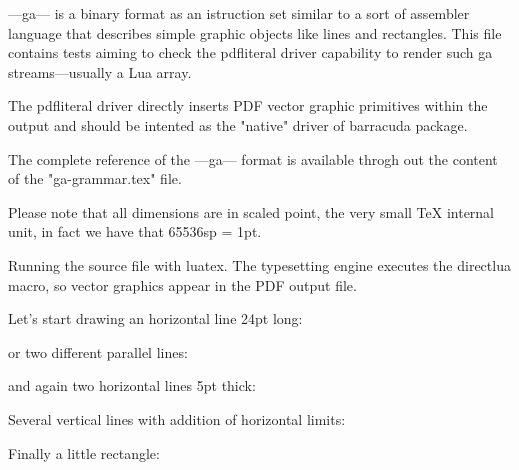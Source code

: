 %

---ga--- is a binary format as an istruction set similar to
a sort of assembler language that describes simple graphic
objects like lines and rectangles.
This file contains tests aiming to check the pdfliteral
driver capability to render such ga streams---usually a Lua
array.

The pdfliteral driver directly inserts PDF vector graphic
primitives within the output and should be intented as the
"native" driver of barracuda package.

The complete reference of the ---ga--- format is available
throgh out the content of the "ga-grammar.tex" file.

Please note that all dimensions are in scaled point, the
very small \TeX{} internal unit, in fact we have that
65536sp = 1pt.

Running the source file with luatex. The typesetting engine
executes the directlua macro, so vector graphics appear in
the PDF output file.

\newbox\mybox
{}

Let's start drawing an horizontal line 24pt long:
\box\mybox

or two different parallel lines:
\box\mybox

and again two horizontal lines 5pt thick:
\box\mybox

Several vertical lines with addition of horizontal limits:
\box\mybox

Finally a little rectangle:
\box\mybox



